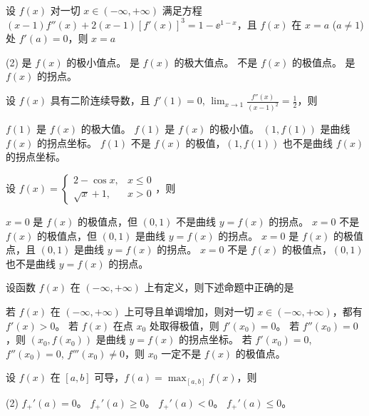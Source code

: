 \begin{ti}
	设 $f(x)$ 对一切 $x \in (-\infty,+\infty)$ 满足方程 $(x-1) f''(x) + 2(x-1) [f'(x)]^3 = 1 - \ee^{1-x}$，且 $f(x)$ 在 $x=a$ ($a \ne 1$) 处 $f'(a) = 0$，则 $x = a$
	\begin{tasks}(2)
		\task 是 $f(x)$ 的极小值点。
		\task 是 $f(x)$ 的极大值点。
		\task 不是 $f(x)$ 的极值点。
		\task 是 $f(x)$ 的拐点。
	\end{tasks}
\end{ti}

\begin{ti}
	设 $f(x)$ 具有二阶连续导数，且 $f'(1)=0$, $\lim_{x \to 1} \frac{f''(x)}{(x-1)^2} = \frac{1}{2}$，则
	\begin{tasks}
		\task $f(1)$ 是 $f(x)$ 的极大值。
		\task $f(1)$ 是 $f(x)$ 的极小值。
		\task $(1,f(1))$ 是曲线 $f(x)$ 的拐点坐标。
		\task $f(1)$ 不是 $f(x)$ 的极值，$(1,f(1))$ 也不是曲线 $f(x)$ 的拐点坐标。
	\end{tasks}
\end{ti}

\begin{ti}
	设 $f(x) = \begin{cases}
		2 - \cos x, & x \leq 0 \\
		\sqrt{x} + 1, & x > 0
	\end{cases}$，则
	\begin{tasks}
		\task $x=0$ 是 $f(x)$ 的极值点，但 $(0,1)$ 不是曲线 $y=f(x)$ 的拐点。
		\task $x=0$ 不是 $f(x)$ 的极值点，但 $(0,1)$ 是曲线 $y=f(x)$ 的拐点。
		\task $x=0$ 是 $f(x)$ 的极值点，且 $(0,1)$ 是曲线 $y=f(x)$ 的拐点。
		\task $x=0$ 不是 $f(x)$ 的极值点，$(0,1)$ 也不是曲线 $y=f(x)$ 的拐点。
	\end{tasks}
\end{ti}

\begin{ti}
	设函数 $f(x)$ 在 $(-\infty,+\infty)$ 上有定义，则下述命题中正确的是
	\begin{tasks}
		\task 若 $f(x)$ 在 $(-\infty,+\infty)$ 上可导且单调增加，则对一切 $x \in (-\infty,+\infty)$，都有 $f'(x) > 0$。
		\task 若 $f(x)$ 在点 $x_0$ 处取得极值，则 $f'(x_0) = 0$。
		\task 若 $f''(x_0) = 0$，则 $(x_0,f(x_0))$ 是曲线 $y=f(x)$ 的拐点坐标。
		\task 若 $f'(x_0) = 0$, $f''(x_0) = 0$, $f'''(x_0) \ne 0$，则 $x_0$ 一定不是 $f(x)$ 的极值点。
	\end{tasks}
\end{ti}

\begin{ti}
	设 $f(x)$ 在 $[a,b]$ 可导，$f(a) = \max_{[a,b]} f(x)$，则
	\begin{tasks}(2)
		\task $f_{+}'(a) = 0$。
		\task $f_{+}'(a) \geq 0$。
		\task $f_{+}'(a) < 0$。
		\task $f_{+}'(a) \leq 0$。
	\end{tasks}
\end{ti}

